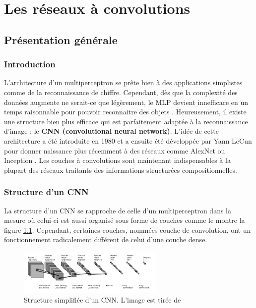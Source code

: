 

\chapter{Les réseaux à convolutions}


\section{Présentation générale}

\subsection{Introduction}
L'architecture d'un multiperceptron se prête bien à des applications simplistes comme de la reconnaissance de chiffre. Cependant, dès que la complexité des données augmente ne serait-ce que légèrement, le MLP devient innefficace en un temps raisonnable pour pouvoir reconnaitre des objets . Heureusement, il existe une structure bien plus efficace qui est parfaitement adaptée à la reconnaissance d'image : le \textbf{CNN (convolutional neural network)}. L'idée de cette architecture a été introduite en 1980 \cite{fukushima_neocognitron_1980} et a ensuite été développée par Yann LeCun \cite{lecun_gradient-based_1998} pour donner naissance plus récemment à des réseaux comme AlexNet \cite{krizhevsky_imagenet_2012} ou Inception \cite{szegedy_going_2014}. Les couches à convolutions sont maintenant indispensables à la plupart des réseaux traitants des informations structurées compositionnelles.

\subsection{Structure d'un CNN}
La structure d'un CNN se rapproche de celle d'un multiperceptron dans la mesure où celui-ci est aussi organisé sous forme de couches comme le montre la figure \ref{structure_1}. Cependant, certaines couches, nommées couche de convolution, ont un fonctionnement radicalement différent de celui d'une couche dense. \\

\begin{figure}[!h]
\centering
\includegraphics[width=200pt]{images/cnn/structure_CNN.png} 
\caption{Structure simplifiée d'un CNN. L'image est tirée de \cite{backpropagation_cnn} }
\label{structure_1}
\end{figure}

